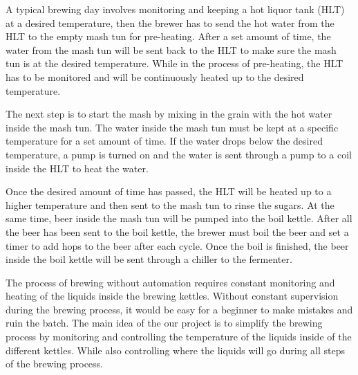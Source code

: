 A typical brewing day involves monitoring and keeping a hot liquor tank (HLT) at a desired temperature, then the
brewer has to send the hot water from the HLT to the empty mash tun for pre-heating. After a set amount of time, the water from the mash tun
will be sent back to the HLT to make sure the mash tun is at the desired temperature. While in the process of
pre-heating, the HLT has to be monitored and will be continuously heated up to the desired temperature.

The next step is to start the mash by mixing in the grain with the hot water inside the mash tun. The water inside the mash tun must be kept at a specific temperature for a set amount of time. If the water drops below the desired temperature, a pump is turned on and the water
is sent through a pump to a coil inside the HLT to heat the water.

Once the desired amount of time has passed, the HLT will
be heated up to a higher temperature and then sent to the mash tun to rinse the sugars.
At the same time, beer inside the mash tun will be pumped into the boil kettle.
After all the beer has been sent to the boil kettle, the brewer must boil the beer and set a timer to add hops to the beer
after each cycle. Once the boil is finished, the beer inside the boil kettle will be sent through a chiller to the fermenter.

The process of brewing without automation requires constant monitoring and heating of the liquids inside the brewing kettles. Without constant supervision during the brewing process, it would be easy for a beginner to make mistakes and ruin the batch. The main idea of the our project is to simplify the brewing process by monitoring and controlling the temperature of the liquids inside of the different kettles. While also controlling where the liquids will go during all steps of the brewing process.
